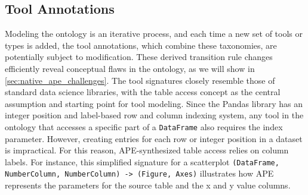\subsection{Tool Annotations}
Modeling the ontology is an iterative process, and each time a new set of tools or types is added, the tool annotations, which combine these taxonomies, are potentially subject to modification. These derived transition rule changes efficiently reveal conceptual flaws in the ontology, as we will show in \autoref{sec:native_ape_challenges}. The tool signatures closely resemble those of standard data science libraries, with the table access concept as the central assumption and starting point for tool modeling. Since the Pandas library has an integer position and label-based row and column indexing system\cite{mckinney2011pandas}, any tool in the ontology that accesses a specific part of a \texttt{DataFrame} also requires the index parameter. However, creating entries for each row or integer position in a dataset is impractical. For this reason, APE-synthesized table access relies on column labels. For instance, this simplified signature for a scatterplot \verb|(DataFrame, NumberColumn, NumberColumn) -> (Figure, Axes)| illustrates how APE represents the parameters for the source table and the x and y value columns.

